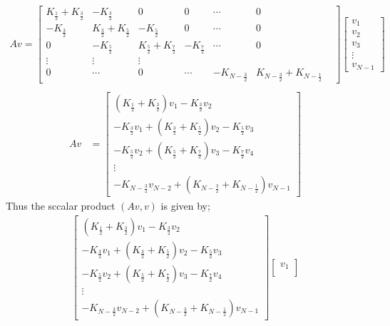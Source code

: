 \documentclass[12pt,a4paper]{article}
\begin{document}
\begin{itemize}
	\begin{align*}
	Av=\begin{bmatrix}
	K_{\frac{1}{2}}+K_{\frac{3}{2}}& -K_{\frac{3}{2}}  & 0&0& \cdots&0 \\
	-K_{\frac{3}{2}}& K_{\frac{3}{2}}+K_{\frac{5}{2}}&-K_{\frac{5}{2}}&0&\cdots&0
	\\
	0&-K_{\frac{5}{2}}&K_{\frac{5}{2}}+K_{\frac{7}{2}}&-K_{\frac{7}{2}}&\cdots&0&\\
	\vdots& \vdots&\vdots\\
	0 &\cdots&0&\cdots&-K_{N-\frac{3}{2}}&K_{N-\frac{3}{2}}+K_{N-\frac{1}{2}}
	\end{bmatrix}\begin{bmatrix}
	v_{1}\\
	v_{2}\\
	v_{3}\\
	\vdots\\
	v_{N-1}
	\end{bmatrix}\\
	\end{align*}
	\begin{align*}
	Av&=\begin{bmatrix}
	\left(K_{\frac{1}{2}}+K_{\frac{3}{2}}\right)v_{1}  -K_{\frac{3}{2}}v_{2}\\
	-K_{\frac{3}{2}}v_{1}+ \left(K_{\frac{3}{2}}+K_{\frac{5}{2}}\right)v_{2}-K_{\frac{5}{2}}v_{3}\\
	-K_{\frac{5}{2}}v_{2}+\left(K_{\frac{5}{2}}+K_{\frac{7}{2}}\right)v_{3}-K_{\frac{7}{2}}v_{4}\\
	\vdots\\
	-K_{N-\frac{3}{2}}v_{N-2}+\left(K_{N-\frac{3}{2}}+K_{N-\frac{1}{2}}\right)v_{N-1}
	\end{bmatrix}
	\end{align*}
	Thus the sccalar product $(Av,v)$ is given by;
	\begin{align*}
	\begin{bmatrix}
	(K_{\frac{1}{2}}+K_{\frac{3}{2}})v_{1}  -K_{\frac{3}{2}}v_{2}\\
	-K_{\frac{3}{2}}v_{1}+ (K_{\frac{3}{2}}+K_{\frac{5}{2}})v_{2}-K_{\frac{5}{2}}v_{3}\\
	-K_{\frac{5}{2}}v_{2}+(K_{\frac{5}{2}}+K_{\frac{7}{2}})v_{3}-K_{\frac{7}{2}}v_{4}\\
	\vdots\\
	-K_{N-\frac{3}{2}}v_{N-2}+(K_{N-\frac{3}{2}}+K_{N-\frac{1}{2}})v_{N-1}
	\end{bmatrix}\begin{bmatrix}
	v_{1}\\

\end{bmatrix}
\end{align*}
\end{itemize}
\end{document}
